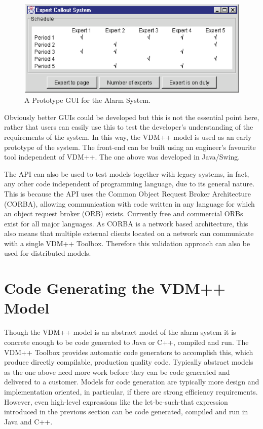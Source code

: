 \documentclass[\pformat,12pt,twoside]{article}
\begin{document}
\begin{figure}[htbp]
\begin{center}
\includegraphics[width=4.999in]{javagui}
\caption{A Prototype GUI for the Alarm System.\label{fig:javagui}}
\end{center}
\end{figure}

Obviously better GUIs could be developed but this is not the 
essential point here, rather that users can easily use this to 
test the developer's understanding of the requirements of the 
system. In this way, the VDM++ model is used as an early prototype 
of the system. The front-end can be built using an engineer's 
favourite tool independent of VDM++. The one above was developed 
in Java/Swing.

The API can also be used to test models together with legacy 
systems, in fact, any other code independent of programming language, 
due to its general nature. This is because the API uses the Common 
Object Request Broker Architecture (CORBA), allowing communication 
with code written in any language for which an object request 
broker (ORB) exists. Currently free and commercial ORBs exist 
for all major languages. As CORBA is a network based architecture, 
this also means that multiple external clients located on a network 
can communicate with a single VDM++ Toolbox. Therefore this validation 
approach can also be used for distributed models.

\section{Code Generating the VDM++ Model}

Though the VDM++ model is an abstract model of the alarm system 
it is concrete enough to be code generated to Java or C++, compiled 
and run. The VDM++ Toolbox provides automatic code generators 
to accomplish this, which produce directly compilable, production 
quality code. Typically abstract models as the one above need 
more work before they can be code generated and delivered to 
a customer. Models for code generation are typically more design 
and implementation oriented, in particular, if there are strong 
efficiency requirements. However, even high-level expressions 
like the let-be-such-that expression introduced in the previous 
section can be code generated, compiled and run in Java and C++.
\end{document}
